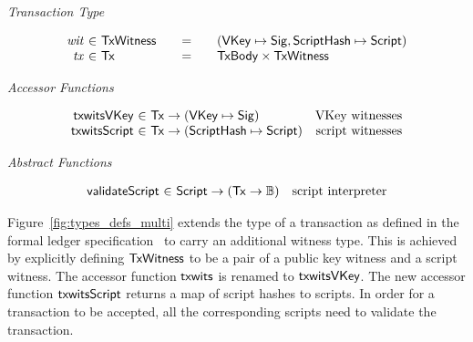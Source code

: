\documentclass[11pt,a4paper,dvipsnames,twosided]{article}
\newcommand{\khcomment}[1]{\todo[color=blue!20]{KH: #1}}
\newcommand{\Bool}{\ensuremath{\mathbb{B}}}
\newcommand{\Tx}{\type{Tx}}
\newcommand{\TxWitness}{\type{TxWitness}}
\newcommand{\TxBody}{\type{TxBody}}
\newcommand{\HashScr}{\type{ScriptHash}}
\newcommand{\Script}{\type{Script}}
\newcommand{\VKey}{\type{VKey}}
\newcommand{\Sig}{\type{Sig}}
\theoremstyle{definition}
\begin{document}
\begin{figure*}[hbt]
  \emph{Transaction Type}

  \begin{equation*}
    \begin{array}{r@{~\in~}l@{\qquad=\qquad}l}
      \var{wit} & \TxWitness & (\VKey \mapsto \Sig, \HashScr \mapsto \Script)
      \\
      \var{tx}
      & \Tx
      & \TxBody \times \TxWitness
      \\
    \end{array}
  \end{equation*}

  \emph{Accessor Functions}

  \begin{equation*}
    \begin{array}{r@{~\in~}lr}
      \fun{txwitsVKey} & \Tx \to (\VKey \mapsto \Sig) & \text{VKey witnesses} \\
      \fun{txwitsScript} & \Tx \to (\HashScr \mapsto \Script) & \text{script witnesses}
    \end{array}
  \end{equation*}

  \emph{Abstract Functions}

  \begin{equation*}
    \begin{array}{r@{~\in~}lr}
      \fun{validateScript} & \Script \to (\Tx \to \Bool) & \text{script interpreter}
    \end{array}
  \end{equation*}
  \caption{Types for Transaction Inputs with Scripts}
  \label{fig:types_defs_multi}
\end{figure*}

Figure~\ref{fig:types_defs_multi} extends the type of a transaction as defined
in the formal ledger specification~\cite{shelley_spec} to carry an additional
witness type. This is achieved by explicitly defining $\TxWitness$ to be a pair
of a public key witness and a script
witness. %
The accessor function $\mathsf{txwits}$ is renamed to $\mathsf{txwitsVKey}$. The new
accessor function $\mathsf{txwitsScript}$ returns a map of script hashes to
scripts.  In order for a transaction to be accepted, all the corresponding
scripts need to validate the transaction.
\end{document}

